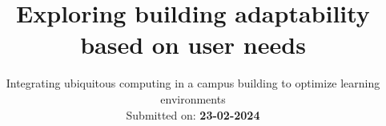 \title{Exploring building adaptability based on user needs}
\subtitle{Integrating ubiquitous computing in a campus building to optimize learning environments\\ Submitted on: \textbf{23-02-2024}}